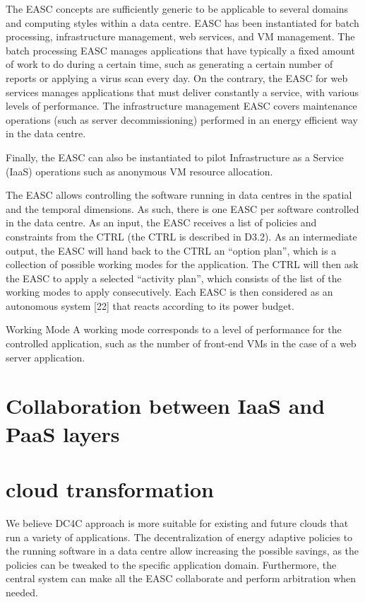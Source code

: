 \documentclass[10pt, conference, compsocconf]{IEEEtran}
\begin{document}
The EASC concepts are sufficiently generic to be applicable to several domains and computing styles within a data centre. EASC has been instantiated for batch processing, infrastructure management, web services, and VM management. The batch processing EASC manages applications that have typically a fixed amount of work to do during a certain time, such as generating a certain number of reports or applying a virus scan every day. On the contrary, the EASC for web services manages applications that must deliver constantly a service, with various levels of performance. The infrastructure management EASC covers maintenance operations (such as server decommissioning) performed in an energy efficient way in the data centre.

Finally, the EASC can also be instantiated to pilot Infrastructure as a Service (IaaS) operations such as anonymous VM resource allocation.

The EASC allows controlling the software running in data centres in the spatial and the temporal dimensions. As such, there is one EASC per software controlled in the data centre. As an input, the EASC receives a list of policies and constraints from the CTRL (the CTRL is described in D3.2). As an intermediate output, the EASC will hand back to the CTRL an “option plan”, which is a collection of possible working modes for the application. The CTRL will then ask the EASC to apply a selected “activity plan”, which consists of the list of the working modes to apply consecutively. Each EASC is then considered as an autonomous system [22] that reacts according to its power budget.

Working Mode
A working mode corresponds to a level of performance for the controlled application, such as the number of front-end VMs in the case of a web server application.


\section{Collaboration between IaaS and PaaS layers}

\section{cloud transformation}
We believe DC4C approach is more suitable for existing and future clouds that run a variety of applications. The decentralization of energy adaptive policies to the running software in a data centre allow increasing the possible savings, as the policies can be tweaked to the specific application domain. Furthermore, the central system can make all the EASC collaborate and perform arbitration when needed.
\end{document}

